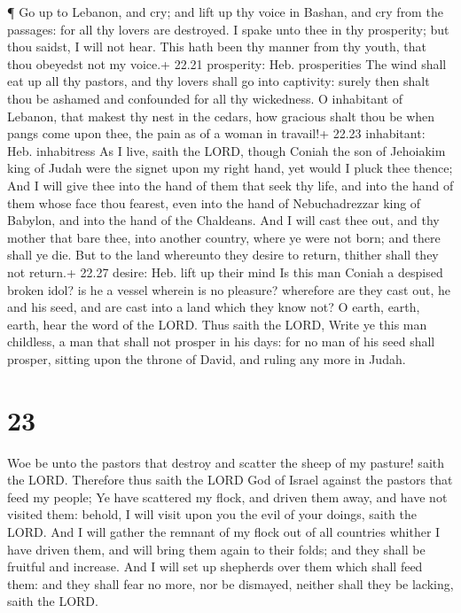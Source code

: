  ¶ Go up to Lebanon, and cry; and lift up thy voice in
Bashan, and cry from the passages: for all thy lovers are destroyed.
 I spake unto thee in thy prosperity; but thou saidst, I
will not hear. This hath been thy manner from thy youth, that thou
obeyedst not my voice.+ 22.21 prosperity: Heb. prosperities
 The wind shall eat up all thy pastors, and thy lovers
shall go into captivity: surely then shalt thou be ashamed and
confounded for all thy wickedness.  O inhabitant of
Lebanon, that makest thy nest in the cedars, how gracious shalt thou be
when pangs come upon thee, the pain as of a woman in travail!+ 22.23
inhabitant: Heb. inhabitress  As I live, saith the LORD,
though Coniah the son of Jehoiakim king of Judah were the signet upon my
right hand, yet would I pluck thee thence;  And I will give
thee into the hand of them that seek thy life, and into the hand of them
whose face thou fearest, even into the hand of Nebuchadrezzar king of
Babylon, and into the hand of the Chaldeans.  And I will
cast thee out, and thy mother that bare thee, into another country,
where ye were not born; and there shall ye die.  But to the
land whereunto they desire to return, thither shall they not return.+
22.27 desire: Heb. lift up their mind  Is this man Coniah a
despised broken idol? is he a vessel wherein is no pleasure? wherefore
are they cast out, he and his seed, and are cast into a land which they
know not?  O earth, earth, earth, hear the word of the
LORD.  Thus saith the LORD, Write ye this man childless, a
man that shall not prosper in his days: for no man of his seed shall
prosper, sitting upon the throne of David, and ruling any more in Judah.

\hypertarget{section-22}{%
\section{23}\label{section-22}}

 Woe be unto the pastors that destroy and scatter the sheep
of my pasture! saith the LORD.  Therefore thus saith the
LORD God of Israel against the pastors that feed my people; Ye have
scattered my flock, and driven them away, and have not visited them:
behold, I will visit upon you the evil of your doings, saith the LORD.
 And I will gather the remnant of my flock out of all
countries whither I have driven them, and will bring them again to their
folds; and they shall be fruitful and increase.  And I will
set up shepherds over them which shall feed them: and they shall fear no
more, nor be dismayed, neither shall they be lacking, saith the LORD.

